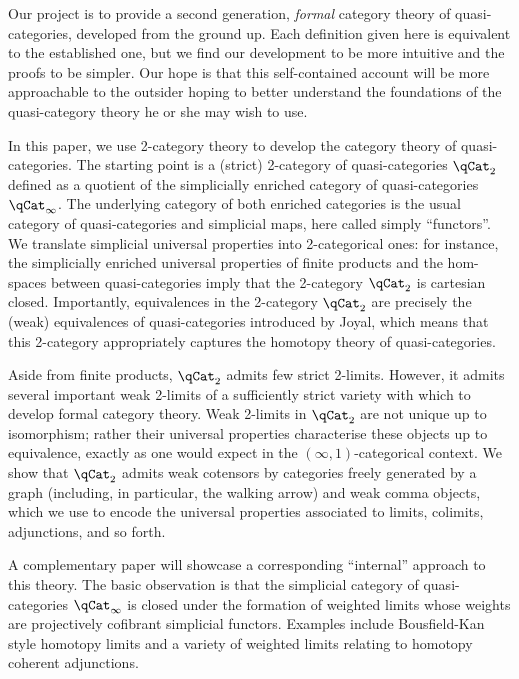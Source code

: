 Our project is to provide a second generation, {\em formal\/} category theory of quasi-categories, developed from the ground up. Each definition given here is equivalent to the established one, 
but we find our development to be more intuitive and the proofs to be simpler. Our hope is that this self-contained account will be more approachable to the outsider hoping to better understand the foundations of the quasi-category theory he or she may wish to use.

In this paper, we use 2-category theory to develop the category theory of quasi-categories.  The starting point is a (strict) 2-category of quasi-categories $\qCat_2$ defined as a quotient of the simplicially enriched category of quasi-categories $\qCat_\infty$.  The underlying category of both enriched categories is the usual category of quasi-categories and simplicial maps, here called simply ``functors''. We translate simplicial universal properties into 2-categorical ones: for instance, the simplicially enriched universal properties of finite products and the hom-spaces between quasi-categories imply that the 2-category $\qCat_2$ is cartesian closed. Importantly, equivalences in the 2-category $\qCat_2$ are precisely the (weak) equivalences of quasi-categories introduced by Joyal, which means that this 2-category appropriately captures the homotopy theory of quasi-categories.

Aside from finite products, $\qCat_2$ admits few strict 2-limits. However, it admits several important weak 2-limits of a sufficiently strict variety with which to develop formal category theory. Weak 2-limits in $\qCat_2$ are not unique up to isomorphism; rather their universal properties characterise these objects up to equivalence, exactly as one would expect in the $(\infty,1)$-categorical context. We show that $\qCat_2$ admits weak cotensors by categories freely generated by a graph (including, in particular, the walking arrow) and weak comma objects, which we use  to encode the universal properties associated to limits, colimits, adjunctions, and so forth.

A complementary paper \cite{RiehlVerity:2012hc} will showcase a corresponding ``internal'' approach to this theory. The basic observation is that the simplicial category of quasi-categories $\qCat_\infty$ is closed under the formation of weighted limits whose weights are projectively cofibrant simplicial functors. Examples include Bousfield-Kan style homotopy limits and a variety of weighted limits relating to homotopy coherent adjunctions.

